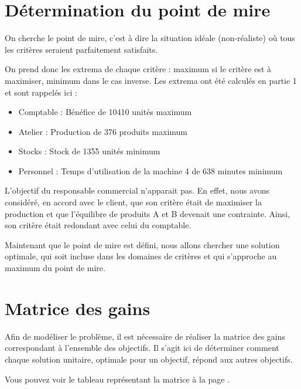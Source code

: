 \documentclass[a4paper,10pt]{article}
\begin{document}
\section{Détermination du point de mire}
On cherche le point de mire, c'est à dire la situation idéale (non-réaliste) où tous les critères seraient parfaitement satisfaits.

On prend donc les extrema de chaque critère : maximum si le critère est à maximiser, minimum dans le cas inverse.
Les extrema  ont été calculés en partie 1 et sont rappelés ici :
\begin{itemize}
\item Comptable : Bénéfice de 10410 unités maximum
\item Atelier : Production de 376 produits maximum
\item Stocks : Stock de 1355 unités minimum
\item Personnel : Temps d'utilisation de la machine 4 de 638 minutes minimum
\end{itemize}

L'objectif du responsable commercial n'apparait pas. En effet, nous avons considéré, en accord avec le client, que son critère était de maximiser la production et que l'équilibre de produits A et B devenait une contrainte. Ainsi, son critère était redondant avec celui du comptable.

Maintenant que le point de mire est défini, nous allons chercher une solution optimale, qui soit incluse dans les domaines de critères et qui s'approche au maximum du point de mire.

\section{Matrice des gains}

Afin de modéliser le problème, il est nécessaire de réaliser la matrice des gains  correspondant à l'ensemble des objectifs.
Il s'agit ici de déterminer comment chaque solution unitaire, optimale pour un objectif, répond aux autres objectifs.

Vous pouvez voir le tableau représentant la matrice à la page \pageref{tab:matgain}.
\end{document}
